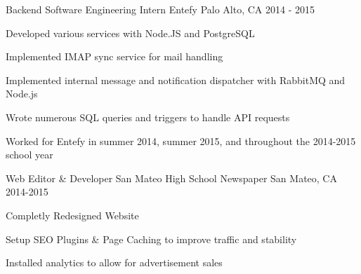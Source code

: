 \begin{cventries}
  \cventry
    {Backend Software Engineering Intern}
    {Entefy}
    {Palo Alto, CA}
    {2014 - 2015}
    {
      \begin{cvitems}
        \item {Developed various services with Node.JS and PostgreSQL}
        \item {Implemented IMAP sync service for mail handling}
        \item {Implemented internal message and notification dispatcher with RabbitMQ and Node.js}
        \item {Wrote numerous SQL queries and triggers to handle API requests}
        \item {Worked for Entefy in summer 2014, summer 2015, and throughout the 2014-2015 school year}
      \end{cvitems}
    }
  \cventry
    {Web Editor \& Developer}
    {San Mateo High School Newspaper}
    {San Mateo, CA}
    {2014-2015}
    {
      \begin{cvitems}
        \item {Completly Redesigned Website}
        \item {Setup SEO Plugins \& Page Caching to improve traffic and stability}
        \item {Installed analytics to allow for advertisement sales}
      \end{cvitems}
    }
\end{cventries}
